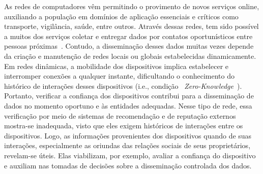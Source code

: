 \documentclass[12pt]{article}
\newcommand{\as}[1]{\textcolor{blue}{{\bf #1}}}
\newcommand{\al}[1]{\textcolor{brown}{{\bf #1}}}
\begin{document}
As redes de computadores vêm permitindo o provimento de novos serviços online, auxiliando a população em domínios de aplicação essenciais e críticos como transporte, vigilância, saúde, entre outros. Através dessas redes, 
tem sido %
possível a muitos dos serviços 
coletar e entregar dados 
por contatos oportunísticos entre pessoas próximas~\cite{garyfalos2008coupons}. 
Contudo, a disseminação desses dados muitas vezes depende da criação e manutenção de redes locais ou globais estabelecidas dinamicamente. Em redes dinâmicas, a mobilidade dos dispositivos implica estabelecer e interromper conexões a qualquer
instante,
dificultando
o conhecimento do histórico de interações desses dispositivos (i.e., condição ~\textit{Zero-Knowledge}~\cite{kim2015hcs}). %
Portanto, 
verificar a confiança dos dispositivos contribui para a  disseminação de dados no momento oportuno e às entidades adequadas.
Nesse tipo de rede,
essa verificação por meio de
sistemas de recomendação e de reputação
externos
mostra-se
inadequada,
visto que eles
exigem
históricos de interações entre os dispositivos.
Logo, %
as
informações
provenientes
dos
dispositivos
quando
de suas interações, especialmente
as
oriundas das relações sociais de seus proprietários, revelam-se
úteis.
Elas
viabilizam,
por exemplo, avaliar a confiança do dispositivo e auxiliam nas tomadas de decisões sobre a disseminação controlada dos dados.


\end{document}
